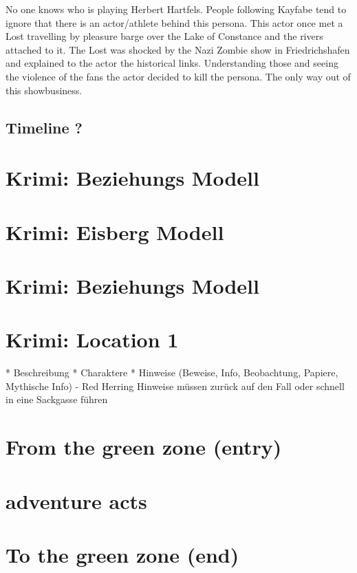 No one knows who is playing Herbert Hartfels. People following Kayfabe tend to ignore that there is an actor/athlete behind this persona.
This actor once met a Lost travelling by pleasure barge over the Lake of Constance and the rivers attached to it.
The Lost was shocked by the Nazi Zombie show in Friedrichshafen and explained to the actor the historical links.
Understanding those and seeing the violence of the fans the actor decided to kill the persona. The only way out of this showbusiness.





\subsection{Timeline ?}

\section{Krimi: Beziehungs Modell}

\section{Krimi: Eisberg Modell}

\section{Krimi: Beziehungs Modell}

\section{Krimi: Location 1}

* Beschreibung
* Charaktere
* Hinweise (Beweise, Info, Beobachtung, Papiere, Mythische Info) - Red Herring Hinweise müssen zurück auf den Fall oder schnell in eine Sackgasse führen


\section{From the green zone (entry)}

\section{adventure acts}

\section{To the green zone (end)}


